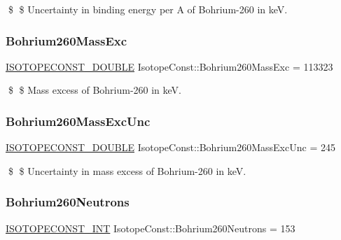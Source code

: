 \$ \$ Uncertainty in binding energy per A of Bohrium-\/260 in keV. \mbox{\label{group___isotope_const-_bohrium-_bh260_ga448b5d9a2c1d867eb722979b29de80c5}} 
\subsubsection{\texorpdfstring{Bohrium260\+Mass\+Exc}{Bohrium260MassExc}}
{\footnotesize\ttfamily \mbox{\hyperlink{group___isotope_const-_macros_ga8f45a7272ce02c0b4c65c44636ed719a}{I\+S\+O\+T\+O\+P\+E\+C\+O\+N\+S\+T\+\_\+\+D\+O\+U\+B\+LE}} Isotope\+Const\+::\+Bohrium260\+Mass\+Exc = 113323}

\$ \$ Mass excess of Bohrium-\/260 in keV. \mbox{\label{group___isotope_const-_bohrium-_bh260_ga9211a667561ec6055a726913f37b1bd3}} 
\subsubsection{\texorpdfstring{Bohrium260\+Mass\+Exc\+Unc}{Bohrium260MassExcUnc}}
{\footnotesize\ttfamily \mbox{\hyperlink{group___isotope_const-_macros_ga8f45a7272ce02c0b4c65c44636ed719a}{I\+S\+O\+T\+O\+P\+E\+C\+O\+N\+S\+T\+\_\+\+D\+O\+U\+B\+LE}} Isotope\+Const\+::\+Bohrium260\+Mass\+Exc\+Unc = 245}

\$ \$ Uncertainty in mass excess of Bohrium-\/260 in keV. \mbox{\label{group___isotope_const-_bohrium-_bh260_ga71f2c3023deac59b50cc9ea68c1d406f}} 
\subsubsection{\texorpdfstring{Bohrium260\+Neutrons}{Bohrium260Neutrons}}
{\footnotesize\ttfamily \mbox{\hyperlink{group___isotope_const-_macros_ga5f18360b3e99483a35c32d789e62621c}{I\+S\+O\+T\+O\+P\+E\+C\+O\+N\+S\+T\+\_\+\+I\+NT}} Isotope\+Const\+::\+Bohrium260\+Neutrons = 153}

